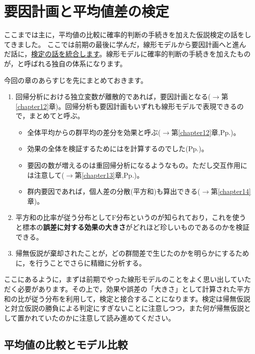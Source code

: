 \documentclass{ltjbook}
\begin{document}
\chapter{要因計画と平均値差の検定}
\label{chapter21}
ここまでは主に，平均値の比較に確率的判断の手続きを加えた仮説検定の話をしてきました。
ここでは前期の最後に学んだ，線形モデルから要因計画へと進んだ話に，\underline{検定の話を統合します}。線形モデルに確率的判断の手続きを加えたものが，と呼ばれる独自の体系になります。

今回の章のあらすじを先にまとめておきます。
\begin{enumerate}
  \item 回帰分析における独立変数が離散的であれば，要因計画となる($\to$第\ref{chapter12}章)。回帰分析も要因計画もいずれも線形モデルで表現できるので，まとめてと呼ぶ。
  \begin{itemize}
    \item 全体平均からの群平均の差分を効果と呼ぶ($\to$第\ref{chapter12}章,Pp.\pageref{generalLinear})。
    \item 効果の全体を検証するためにはを計算するのでした(Pp.\pageref{HowToEvaluateTheDifference})。
    \item 要因の数が増えるのは重回帰分析になるようなもの。ただし交互作用には注意して($\to$第\ref{chapter13}章,Pp.\pageref{interaction})。
    \item 群内要因であれば，個人差の分散(平方和)も算出できる($\to$第\ref{chapter14}章)。
  \end{itemize}
  \item 平方和の比率が従う分布としてF分布というのが知られており，これを使うと標本の\textbf{誤差に対する効果の大きさ}がどれほど珍しいものであるのかを検証できる。
  \item 帰無仮説が棄却されたことが，どの群間差で生じたのかを明らかにするために，を行うことでさらに精緻に分析する。
\end{enumerate}

ここにあるように，まずは前期でやった線形モデルのことをよく思い出していただく必要があります。その上で，効果や誤差の「大きさ」として計算された平方和の比が従う分布を利用して，検定と接合することになります。検定は帰無仮説と対立仮説の勝負による判定にすぎないことに注意しつつ，また何が帰無仮説として置かれていたのかに注意して読み進めてください。

\section{平均値の比較とモデル比較}
\end{document}
